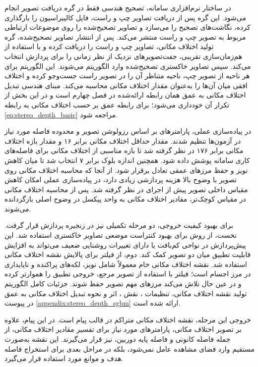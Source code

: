 در ساختار نرم‌افزاری سامانه، تصحیح هندسی فقط در گره دریافت تصویر انجام می‌شود. این گره پس از دریافت تصاویر چپ و راست، فایل کالیبراسیون را بارگذاری کرده، نگاشت‌های تصحیح را می‌سازد و تصاویر تصحیح‌شده را روی موضوعات ارتباطی مربوط به تصویر چپ و راست منتشر می‌کند. پس از انتشار تصاویر تصحیح‌شده، گره تولید اختلاف مکانی، تصاویر چپ و راست را دریافت کرده و با استفاده از هم‌زمان‌سازی تقریبی، جفت‌تصویرهای نزدیک از نظر زمانی را برای پردازش انتخاب می‌کند. سپس تصاویر خاکستری تصحیح‌شده وارد الگوریتم  می‌شوند. این الگوریتم برای هر ناحیه از تصویر چپ، ناحیه متناظر آن را در تصویر راست جست‌وجو کرده و اختلاف افقی میان آن‌ها را به‌عنوان مقدار اختلاف مکانی محاسبه می‌کند. مبنای هندسی تبدیل اختلاف مکانی به عمق همان رابطه ارائه‌شده در فصل چهارم است و در این بخش از تکرار آن خودداری می‌شود؛ برای رابطه عمق بر حسب اختلاف مکانی به رابطه \ref{eq:stereo_depth_basic} مراجعه شود.

در پیاده‌سازی عملی، پارامترهای  بر اساس رزولوشن تصویر و محدوده فاصله مورد نیاز در آزمون‌ها تنظیم شدند. مقدار حداقل اختلاف مکانی برابر ۱۶ و مقدار بازه اختلاف مکانی برابر ۱۷۶ در نظر گرفته شد تا بازه مناسبی از اختلاف مکانی برای فاصله‌های کاری سامانه پوشش داده شود. همچنین اندازه بلوک برابر ۷ انتخاب شد تا میان کاهش نویز و حفظ مرزهای عمقی تعادل برقرار شود. از آنجا که محاسبه اختلاف مکانی روی تصویر با وضوح بالا هزینه پردازشی زیادی دارد، در پیاده‌سازی عملی امکان کاهش مقیاس داخلی تصویر پیش از اجرای  در نظر گرفته شد. پس از محاسبه اختلاف مکانی در مقیاس کوچک‌تر، مقادیر اختلاف مکانی به واحد پیکسل در وضوح اصلی بازگردانده می‌شوند.

برای بهبود کیفیت خروجی، دو مرحله تکمیلی نیز در زنجیره پردازش قرار گرفت. نخست، از روش  برای بهبود کنتراست موضعی تصاویر خاکستری استفاده شد. این پیش‌پردازش در نواحی کم‌بافت یا دارای تغییرات روشنایی ضعیف می‌تواند به افزایش قابلیت تطبیق میان دو تصویر کمک کند. دوم، از فیلتر  برای پالایش نقشه اختلاف مکانی استفاده شد. نقشه اختلاف مکانی خام معمولاً شامل نویز، لکه‌های پراکنده و ناپایداری در مرز اجسام است؛ فیلتر  با استفاده از تصویر مرجع، خروجی تطبیق را هموارتر کرده و در عین حال تلاش می‌کند مرزهای مهم تصویر حفظ شوند. جزئیات کامل الگوریتم تولید نقشه اختلاف مکانی، تنظیمات ، نقش ، اثر  و نحوه تبدیل اختلاف مکانی به عمق در پیوست \ref{appendix:stereo_depth_sgbm} ارائه شده است.

خروجی این مرحله، نقشه اختلاف مکانی متراکم در قالب پیام  است. در این پیام، علاوه بر تصویر اختلاف مکانی، پارامترهای مورد نیاز برای تفسیر مقادیر اختلاف مکانی، از جمله فاصله کانونی و فاصله پایه دوربین، نیز قرار می‌گیرند. این نقشه به‌صورت مستقیم وارد فضای مشاهده عامل نمی‌شود، بلکه در مراحل بعدی برای استخراج فاصله هدف و موانع مورد استفاده قرار می‌گیرد.

